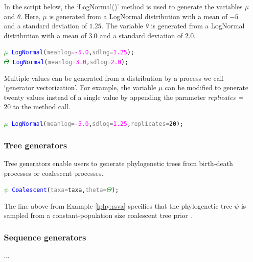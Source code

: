 \documentclass[10pt,letterpaper,table]{article}
\begin{document}
In the script below, the `LogNormal()' method is used to generate the variables $\mu$ and $\theta$. 
Here, $\mu$ is generated from a LogNormal distribution with a mean of $-5$ and a standard deviation of $1.25$. 
The variable $\theta$ is generated from a LogNormal distribution with a mean of $3.0$ and a standard deviation of $2.0$.  

{\singlespacing
\begin{alltt}
  \textcolor{green}{\(\mu\)} ~ \textcolor{blue}{LogNormal}(\textcolor{gray}{meanlog=}\textcolor{magenta}{-5.0}, \textcolor{gray}{sdlog=}\textcolor{magenta}{1.25});
  \textcolor{green}{\(\Theta\)} ~ \textcolor{blue}{LogNormal}(\textcolor{gray}{meanlog=}\textcolor{magenta}{3.0}, \textcolor{gray}{sdlog=}\textcolor{magenta}{2.0});
\end{alltt}
}

Multiple values can be generated from a distribution by a process we call `generator vectorization'. 
For example, the variable $\mu$ can be modified to generate twenty values instead of a single value by appending the parameter \textit{replicates = $20$} to the method call. 

{\singlespacing
\begin{alltt}
  \textcolor{green}{\(\mu\)} ~ \textcolor{blue}{LogNormal}(\textcolor{gray}{meanlog=}\textcolor{magenta}{-5.0}, \textcolor{gray}{sdlog=}\textcolor{magenta}{1.25}, \textcolor{gray}{replicates=}20);
\end{alltt}
}

\subsubsection{Tree generators}
Tree generators enable users to generate phylogenetic trees from birth-death processes or coalescent processes. 
{\small
  \begin{alltt}
    \textcolor{green}{\(\psi\)} ~ \textcolor{blue}{Coalescent}(\textcolor{gray}{taxa=}taxa, \textcolor{gray}{theta=}\textcolor{green}{\(\Theta\)});
  \end{alltt}
}
The line above from Example \ref{lphy:rsva} specifies that the
phylogenetic tree \texttt{$\psi$} is sampled from a
constant-population size coalescent tree prior \cite{kingman82}.
\newline

\subsubsection{Sequence generators}
...
\end{document}

